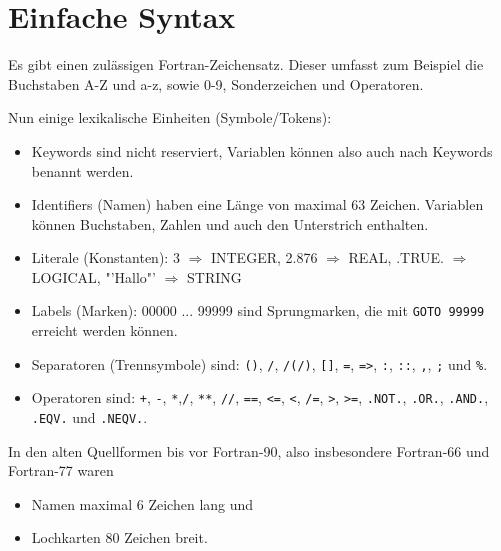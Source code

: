 \section{Einfache Syntax}

Es gibt einen zulässigen Fortran-Zeichensatz. Dieser umfasst zum Beispiel die Buchstaben A-Z und a-z, sowie 0-9, Sonderzeichen und Operatoren.

Nun einige lexikalische Einheiten (Symbole/Tokens):
\begin{itemize}
	\item Keywords sind nicht reserviert, Variablen können also auch nach Keywords benannt werden.
	\item Identifiers (Namen) haben eine Länge von maximal 63 Zeichen. Variablen können Buchstaben, Zahlen und auch den Unterstrich enthalten.
	\item Literale (Konstanten): 3 $\Rightarrow$ INTEGER, 2.876 $\Rightarrow$ REAL, .TRUE. $\Rightarrow$ LOGICAL, "'Hallo"' $\Rightarrow$ STRING
	\item Labels (Marken): 00000 ... 99999 sind Sprungmarken, die mit \texttt{GOTO 99999} erreicht werden können.
	\item Separatoren (Trennsymbole) sind: \texttt{()}, \texttt{/}, \texttt{/(/)}, \texttt{[]}, \texttt{=}, \texttt{=>}, \texttt{:}, \texttt{::}, \texttt{,}, \texttt{;} und \texttt{\%}.
	\item Operatoren sind: \texttt{+}, \texttt{-}, \texttt{*},\texttt{/}, \texttt{**}, \texttt{//}, \texttt{==}, \texttt{<=}, \texttt{<}, \texttt{/=}, \texttt{>}, \texttt{>=}, \texttt{.NOT.}, \texttt{.OR.}, \texttt{.AND.}, \texttt{.EQV.} und \texttt{.NEQV.}.
\end{itemize}

In den alten Quellformen bis vor Fortran-90, also insbesondere Fortran-66 und Fortran-77 waren
\begin{itemize}
	\item Namen maximal 6 Zeichen lang und
	\item Lochkarten 80 Zeichen breit.
\end{itemize}

